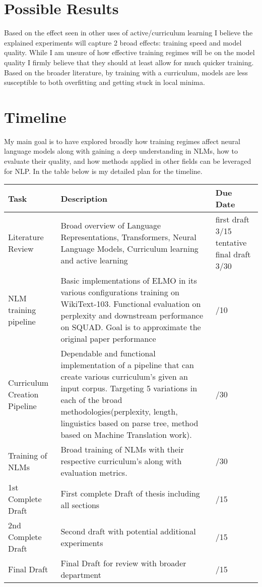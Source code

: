 \documentclass[11pt,a4paper]{article}
\begin{document}
\section{Possible Results}
Based on the effect seen in other uses of active/curriculum learning I believe the explained experiments will capture 2 broad effects: training speed and model quality. While I am unsure of how effective training regimes will be on the model quality I firmly believe that they should at least allow for much quicker training. Based on the broader literature, by training with a curriculum, models are less susceptible to both overfitting and getting stuck in local minima.
\section{Timeline}
My main goal is to have explored broadly how training regimes affect neural language models along with gaining a deep understanding in NLMs, how to evaluate their quality, and how methods applied in other fields can be leveraged for NLP. In the table below is my detailed plan for the timeline.
\clearpage
\begin{tabularx}{1.01\textwidth} { 
  | >{\raggedright\arraybackslash}X 
  | >{\centering\arraybackslash}X 
  | >{\centering\arraybackslash}X  | }
 \hline
 \textbf{Task} & \textbf{Description} & \textbf{Due Date}  \\
 \hline
 Literature Review  &  Broad overview of Language Representations, Transformers, Neural Language Models, Curriculum learning and active learning
 & {first draft 3/15 \newline
 tentative final draft 3/30} \\
 \hline
 NLM training pipeline & Basic implementations of ELMO in its various configurations training on WikiText-103. Functional evaluation on perplexity and downstream performance on SQUAD. Goal is to approximate the original paper performance & 04/10 \\ \hline
 Curriculum Creation Pipeline & Dependable and functional implementation of a pipeline that can create various curriculum's given an input corpus. Targeting 5 variations in each of the broad methodologies(perplexity, length, linguistics based on parse tree, method based on Machine Translation work). & 04/30 \\
 Training of NLMs & Broad training of NLMs with their respective curriculum's along with evaluation metrics. & 05/30\\ \hline
 1st Complete Draft & First complete Draft of thesis including all sections & 06/15 \\ \hline
 2nd Complete Draft & Second draft with potential additional experiments & 07/15 \\ \hline 
 Final Draft & Final Draft for review with broader department & 08/15
\end{tabularx}
\clearpage
\nocite{*}


\end{document}
